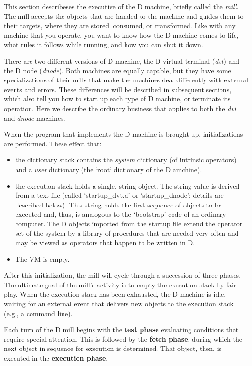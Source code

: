 This  section describeses the executive of the D machine,  briefly  called the \emph{mill}.  The mill accepts the objects that are handed to the machine and guides  them  to their targets,  where  they  are  stored,  consumed,  or transformed. Like with any machine that you operate, you want to know how the D machine comes to life, what rules it follows while running, and how you can shut it down.

There are two different versions of D machine, the D virtual terminal (\emph{dvt}) and the D node (\emph{dnode}). Both machines are equally capable, but they have some specializations of their mills that make the machines deal differently with  external events and errors. These differences will be described in subsequent sections, which also tell you how to start up each type of D machine, or terminate its operation. Here we describe the ordinary business that applies to both the \emph{dvt} and \emph{dnode} machines.

When  the  program  that  implements  the  D  machine  is  brought   up, initializations are performed. These effect that:

\begin{itemize}
\item the  dictionary stack contains the \emph{system} dictionary  (of  intrinsic operators) and a \emph{user} dictionary (the `root` dictionary of the D amchine).
\item the execution stack holds a single,  string object. The string value is  derived  from a text file (called `startup\_dvt.d' or `startup\_dnode'; details are described below).  This string holds the first sequence  of  objects  to be executed and,  thus,  is  analogous  to  the `bootstrap'  code  of an ordinary computer. The D objects imported from the startup file extend the operator set of the system by a library of procedures that are needed very often and may be viewed as operators that happen to be written in D.
\item The VM is empty.
\end{itemize}

After this initialization,  the mill will cycle through a succession  of three  phases.  The ultimate goal of the mill's activity is to empty  the execution stack by fair play. When the execution stack has been exhausted, the D machine is idle, waiting for an external event that delivers new objects to the execution stack (e.g., a command line).

Each  turn of the D mill  begins with the \textbf{test phase} evaluating conditions  that require special attention. This is followed by the \textbf{fetch phase},  during  which  the next object in sequence for execution is  determined.  That object, then, is executed in the \textbf{execution phase}.

